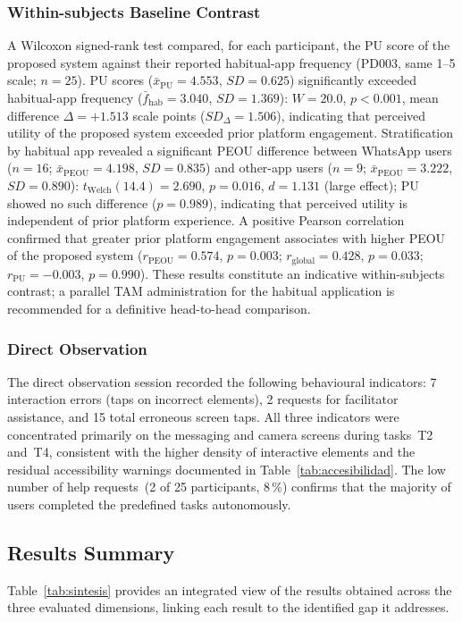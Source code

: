 \documentclass[journal]{IEEEtran}
\begin{document}
	\subsubsection{Within-subjects Baseline Contrast}
	\label{sec:baseline_contrast}
	A Wilcoxon signed-rank test compared, for each participant,
	the PU score of the proposed system against their reported
	habitual-app frequency (PD003, same 1--5 scale; $n{=}25$).
	PU scores ($\bar{x}_{\text{PU}}{=}4.553$, $SD{=}0.625$)
	significantly exceeded habitual-app frequency
	($\bar{f}_{\text{hab}}{=}3.040$, $SD{=}1.369$):
	$W{=}20.0$, $p{<}0.001$, mean difference $\Delta{=}{+}1.513$
	scale points ($SD_{\Delta}{=}1.506$), indicating that perceived
	utility of the proposed system exceeded prior platform engagement.
	Stratification by habitual app revealed a significant PEOU
	difference between WhatsApp users ($n{=}16$;
	$\bar{x}_{\text{PEOU}}{=}4.198$, $SD{=}0.835$) and other-app
	users ($n{=}9$; $\bar{x}_{\text{PEOU}}{=}3.222$, $SD{=}0.890$):
	$t_{\text{Welch}}(14.4){=}2.690$, $p{=}0.016$, $d{=}1.131$
	(large effect); PU showed no such difference ($p{=}0.989$),
	indicating that perceived utility is independent of prior
	platform experience.
	A positive Pearson correlation confirmed that greater prior
	platform engagement associates with higher PEOU of the proposed
	system ($r_{\text{PEOU}}{=}0.574$, $p{=}0.003$; $r_{\text{global}}{=}0.428$,
	$p{=}0.033$; $r_{\text{PU}}{=}{-}0.003$, $p{=}0.990$).
	These results constitute an indicative within-subjects contrast;
	a parallel TAM administration for the habitual application is
	recommended for a definitive head-to-head comparison.
	
	\subsubsection{Direct Observation}
	The direct observation session recorded the following
	behavioural indicators:
	7 interaction errors (taps on incorrect elements),
	2 requests for facilitator assistance, and 15 total
	erroneous screen taps.
	All three indicators were concentrated primarily on the
	messaging and camera screens during tasks~T2 and~T4,
	consistent with the higher density of interactive elements
	and the residual accessibility warnings documented in
	Table~\ref{tab:accesibilidad}.
	The low number of help requests~(2 of 25 participants, 8\,\%)
	confirms that the majority of users completed the predefined
	tasks autonomously.
	
	\subsection{Results Summary}
	Table~\ref{tab:sintesis} provides an integrated view of the
	results obtained across the three evaluated dimensions,
	linking each result to the identified gap it addresses.
	
\end{document}
